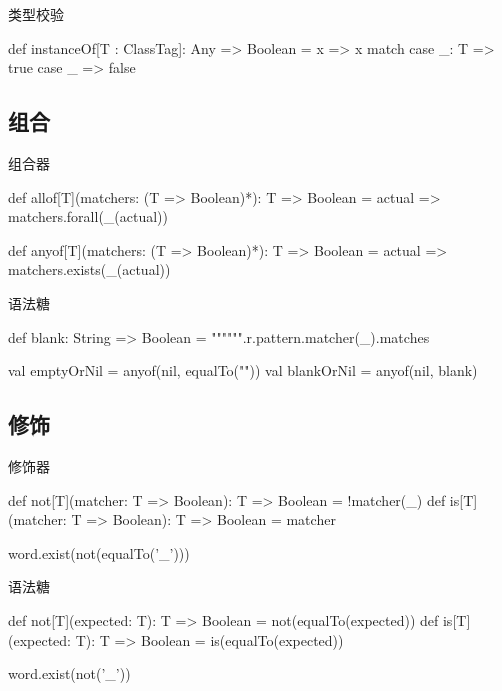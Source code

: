 \begin{frame}[fragile]{类型校验}
  \begin{scala}
def instanceOf[T : ClassTag]: Any => Boolean = x =>
  x match {
    case _: T => true
    case _    => false
  }
  \end{scala}
\end{frame}

\subsection{组合}

\begin{frame}[fragile]{组合器}
  \begin{scala}
def allof[T](matchers: (T => Boolean)*): T => Boolean =
  actual => matchers.forall(_(actual))

def anyof[T](matchers: (T => Boolean)*): T => Boolean =
  actual => matchers.exists(_(actual))
  \end{scala}
\end{frame}

\begin{frame}[fragile]{语法糖}
  \begin{scala}
def blank: String => Boolean = 
  """\s*""".r.pattern.matcher(_).matches

val emptyOrNil = anyof(nil, equalTo(""))
val blankOrNil = anyof(nil, blank)
  \end{scala}
\end{frame}

\subsection{修饰}

\begin{frame}[fragile]{修饰器}
  \begin{scala}
def not[T](matcher: T => Boolean): T => Boolean = !matcher(_)
def is[T](matcher: T => Boolean):  T => Boolean = matcher

word.exist(not(equalTo('_')))
  \end{scala}
\end{frame}

\begin{frame}[fragile]{语法糖}
  \begin{scala}
def not[T](expected: T): T => Boolean = not(equalTo(expected))
def is[T](expected: T):  T => Boolean = is(equalTo(expected))

word.exist(not('_'))
  \end{scala}
\end{frame}

